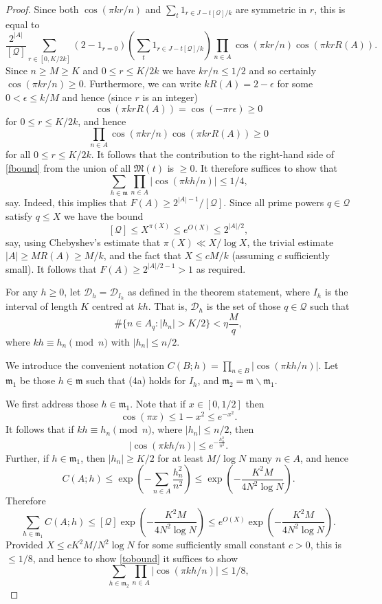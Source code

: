 \documentclass{amsart}
\newcommand{\abs}[1]{\left\lvert #1\right\rvert}
\newcommand{\brac}[1]{\left( #1\right)}
\begin{document}
\begin{proof}
Since both $\cos(\pi kr/n)$ and $\sum_t 1_{r\in J-t[\mathcal{Q}]/k}$ are symmetric in $r$, this is equal to
\[\frac{2^{\abs{A}}}{[\mathcal{Q}]}\sum_{r\in [0,K/2k]}(2-1_{r=0})\brac{\sum_{t}1_{r\in J-t[\mathcal{Q}]/k}}\prod_{n\in A}\cos(\pi kr/n)\cos(\pi kr R(A)).\]
Since $n\geq M\geq K$ and $0\leq r\leq K/2k$ we have $kr/n\leq 1/2$ and so certainly $\cos(\pi kr/n)\geq 0$. Furthermore, we can write $kR(A)=2-\epsilon$ for some $0<\epsilon\leq k/M$ and hence (since $r$ is an integer)
\[\cos(\pi kr R(A)) = \cos(-\pi r\epsilon)\geq 0\]
for $0\leq r\leq K/2k$, and hence 
\[\prod_{n\in A}\cos(\pi kr/n)\cos(\pi kr R(A))\geq 0\]
for all $0\leq r\leq K/2k$. It follows that the contribution to the right-hand side of \eqref{fbound} from the union of all $\mathfrak{M}(t)$ is $\geq 0$. It therefore suffices to show that 
\begin{equation}\label{tobound}
\sum_{h\in\mathfrak{m}}\prod_{n\in A}\abs{\cos(\pi kh/n)}\leq 1/4,
\end{equation}
say. Indeed, this implies that $F(A)\geq 2^{\abs{A}-1}/[\mathcal{Q}]$. Since all prime powers $q\in\mathcal{Q}$ satisfy $q\leq X$ we have the bound
\[ [\mathcal{Q}]\leq  X^{\pi(X)}\leq e^{O(X)}\leq 2^{\abs{A}/2},\]
say, using Chebyshev's estimate that $\pi(X)\ll X/\log X$, the trivial estimate $\abs{A}\geq MR(A)\geq M/k$, and the fact that $X\leq cM/k$ (assuming $c$ sufficiently small). It follows that $F(A)\geq 2^{\abs{A}/2-1}>1$ as required.


 
For any $h\geq 0$, let $\mathcal{D}_h=\mathcal{D}_{I_h}$ as defined in the theorem statement, where $I_h$ is the interval of length $K$ centred at $kh$. That is, $\mathcal{D}_h$ is the set of those $q\in \mathcal{Q}$ such that 
\[\#\{ n\in A_q:\abs{h_n}> K/2 \}< \eta \frac{M}{q},\]
where $kh\equiv h_n \pmod{n}$ with $\abs{h_n}\leq n/2$.

We introduce the convenient notation $C(B;h) = \prod_{n\in B}\abs{\cos(\pi kh/n)}$. Let $\mathfrak{m}_1$ be those $h\in\mathfrak{m}$ such that (4a) holds for $I_h$, and $\mathfrak{m}_2=\mathfrak{m}\backslash\mathfrak{m}_1$. 

We first address those $h\in\mathfrak{m}_1$. Note that if $x\in [0,1/2]$ then
\[\cos(\pi x) \leq 1-x^2\leq  e^{-x^2}.\]
It follows that if $kh\equiv h_n \pmod{n}$, where $\abs{h_n}\leq n/2$, then
\[\abs{\cos(\pi kh/n)}\leq e^{-\frac{h_n^2}{n^2}}.\] 
Further, if $h\in\mathfrak{m}_1$, then $\abs{h_n}\geq K/2$ for at least $M/\log N$ many $n\in A$, and hence
\[C(A;h)\leq \exp\brac{-\sum_{n\in A}\frac{h_n^2}{n^2}}\leq \exp\brac{-\frac{K^2M}{4N^2\log N}}.\]
Therefore
\[\sum_{h\in\mathfrak{m}_1}C(A;h)\leq [\mathcal{Q}]\exp\brac{-\frac{K^2M}{4N^2\log N}}\leq e^{O(X)}\exp\brac{-\frac{K^2M}{4N^2\log N}}.\]
Provided $X\leq c K^2M/N^2\log N$ for some sufficiently small constant $c>0$, this is $\leq 1/8$, and hence to show \eqref{tobound} it suffices to show 
\begin{equation}\label{tobound3}
\sum_{h\in\mathfrak{m}_2}\prod_{n\in A}\abs{\cos(\pi kh/n)}\leq 1/8,
\end{equation}


\end{proof}
\end{document}
